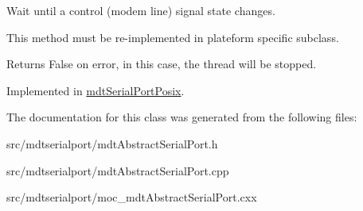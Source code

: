 Wait until a control (modem line) signal state changes. 

This method must be re-\/implemented in plateform specific subclass. \begin{DoxyReturn}{Returns}
False on error, in this case, the thread will be stopped. 
\end{DoxyReturn}


Implemented in \hyperlink{classmdt_serial_port_posix_a8ec213863c6eacfc8d3079aadc9ef43b}{mdtSerialPortPosix}.



The documentation for this class was generated from the following files:\begin{DoxyCompactItemize}
\item 
src/mdtserialport/mdtAbstractSerialPort.h\item 
src/mdtserialport/mdtAbstractSerialPort.cpp\item 
src/mdtserialport/moc\_\-mdtAbstractSerialPort.cxx\end{DoxyCompactItemize}
